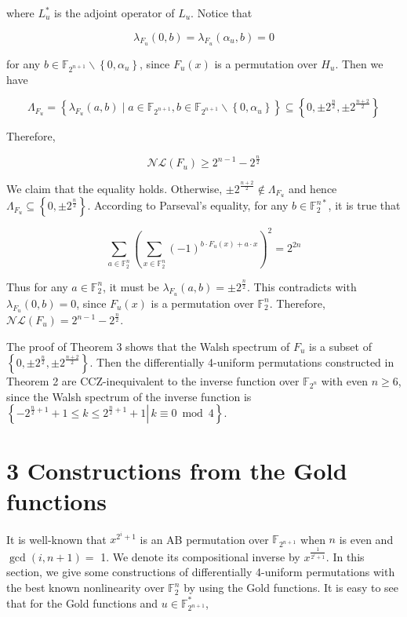 \documentclass[10pt]{article}
\begin{document}
where $L_{u}^{*}$ is the adjoint operator of $L_{u}$. Notice that

$$
\lambda_{F_{u}}(0, b)=\lambda_{F_{u}}\left(\alpha_{u}, b\right)=0
$$

for any $b \in \mathbb{F}_{2^{n+1}} \backslash\left\{0, \alpha_{u}\right\}$, since $F_{u}(x)$ is a permutation over $H_{u}$. Then we have

$$
\Lambda_{F_{u}}=\left\{\lambda_{F_{u}}(a, b) \mid a \in \mathbb{F}_{2^{n+1}}, b \in \mathbb{F}_{2^{n+1}} \backslash\left\{0, \alpha_{u}\right\}\right\} \subseteq\left\{0, \pm 2^{\frac{n}{2}}, \pm 2^{\frac{n+2}{2}}\right\}
$$

Therefore,

$$
\mathcal{N} \mathcal{L}\left(F_{u}\right) \geq 2^{n-1}-2^{\frac{n}{2}}
$$

We claim that the equality holds. Otherwise, $\pm 2^{\frac{n+2}{2}} \notin \Lambda_{F_{u}}$ and hence $\Lambda_{F_{u}} \subseteq\left\{0, \pm 2^{\frac{n}{2}}\right\}$. According to Parseval's equality, for any $b \in \mathbb{F}_{2}^{n *}$, it is true that

$$
\sum_{a \in \mathbb{F}_{2}^{n}}\left(\sum_{x \in \mathbb{F}_{2}^{n}}(-1)^{b \cdot F_{u}(x)+a \cdot x}\right)^{2}=2^{2 n}
$$

Thus for any $a \in \mathbb{F}_{2}^{n}$, it must be $\lambda_{F_{u}}(a, b)= \pm 2^{\frac{n}{2}}$. This contradicts with $\lambda_{F_{u}}(0, b)=0$, since $F_{u}(x)$ is a permutation over $\mathbb{F}_{2}^{n}$. Therefore, $\mathcal{N} \mathcal{L}\left(F_{u}\right)=2^{n-1}-2^{\frac{n}{2}}$.

The proof of Theorem 3 shows that the Walsh spectrum of $F_{u}$ is a subset of $\left\{0, \pm 2^{\frac{n}{2}}, \pm 2^{\frac{n+2}{2}}\right\}$. Then the differentially 4-uniform permutations constructed in Theorem 2 are CCZ-inequivalent to the inverse function over $\mathbb{F}_{2^{n}}$ with even $n \geq 6$, since the Walsh spectrum of the inverse function is $\left\{\left.-2^{\frac{n}{2}+1}+1 \leq k \leq 2^{\frac{n}{2}+1}+1 \right\rvert\, k \equiv 0 \bmod 4\right\}$.

\section*{3 Constructions from the Gold functions}
It is well-known that $x^{2^{i}+1}$ is an AB permutation over $\mathbb{F}_{2^{n+1}}$ when $n$ is even and $\operatorname{gcd}(i, n+1)=$ 1. We denote its compositional inverse by $x^{\frac{1}{2^{i}+1}}$. In this section, we give some constructions of differentially 4-uniform permutations with the best known nonlinearity over $\mathbb{F}_{2}^{n}$ by using the Gold functions. It is easy to see that for the Gold functions and $u \in \mathbb{F}_{2^{n+1}}^{*}$,
\end{document}
